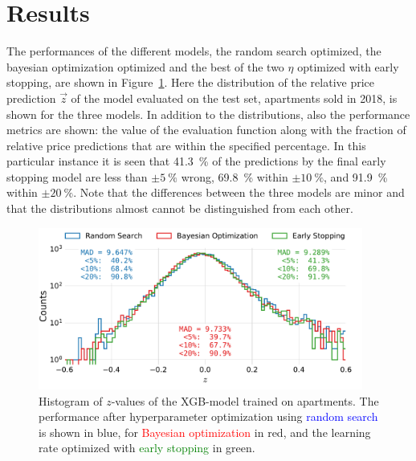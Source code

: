 \FloatBarrier
\section{Results}
\label{sec:h:results}

The performances of the different models, the random search optimized, the bayesian optimization optimized and the best of the two $\eta$ optimized with early stopping, are shown in Figure~\ref{fig:h:CV_res_performance_ejer}. Here the distribution of the relative price prediction $\vec{z}$ of the model evaluated on the test set, apartments sold in \num{2018}, is shown for the three models. In addition to the distributions, also the performance metrics are shown: the value of the evaluation function along with the fraction of relative price predictions that are within the specified percentage. In this particular instance it is seen that \SI{41.3}{\percent} of the predictions by the final early stopping model are less than $\pm\SI{5}{\percent}$ wrong, \SI{69.8}{\percent} within $\pm\SI{10}{\percent}$, and \SI{91.9}{\percent} within $\pm\SI{20}{\percent}$. Note that the differences between the three models are minor and that the distributions almost cannot be distinguished from each other. 

\begin{figure}[h!]
  \includegraphics[width=0.95\textwidth, trim=0 10 10 5, clip]{figures/housing/Ejerlejlighed_v19_cut_all_Ncols_all_xgb_z_hist_metrics.pdf}
  \caption[Performance of XGB-model for Apartments]
          {Histogram of $z$-values of the XGB-model trained on apartments. The performance after hyperparameter optimization using \textcolor{blue}{random search} is shown in blue, for \textcolor{red}{Bayesian optimization} in red, and the learning rate optimized with \textcolor{green}{early stopping} in green.
          } 
  \label{fig:h:CV_res_performance_ejer}
\end{figure}

